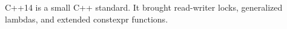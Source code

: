 

C++14 is a small C++ standard. It brought read-writer locks, generalized lambdas, and extended constexpr functions.